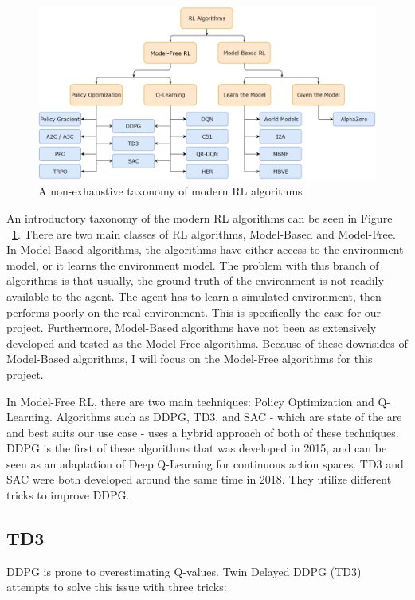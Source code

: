 \documentclass[12pt,twoside]{report}
\begin{document}
\begin{figure}[h]
\centering
\includegraphics[width = 0.9\hsize]{figures/RL algorithms.png}
\caption{A non-exhaustive taxonomy of modern RL algorithms \cite{openai:rl-algs}}
\label{fig:rl-algs}
\end{figure}

An introductory taxonomy of the modern RL algorithms can be seen in Figure ~\ref{fig:rl-algs}. There are two main classes of RL algorithms, Model-Based and Model-Free. In Model-Based algorithms, the algorithms have either access to the environment model, or it learns the environment model. The problem with this branch of algorithms is that usually, the ground truth of the environment is not readily available to the agent. The agent has to learn a simulated environment, then performs poorly on the real environment. This is specifically the case for our project. Furthermore, Model-Based algorithms have not been as extensively developed and tested as the Model-Free algorithms. \cite{openai:rl-algs} Because of these downsides of Model-Based algorithms, I will focus on the Model-Free algorithms for this project.

In Model-Free RL, there are two main techniques: Policy Optimization and Q-Learning. Algorithms such as DDPG, TD3, and SAC - which are state of the are and best suits our use case - uses a hybrid approach of both of these techniques.
DDPG is the first of these algorithms that was developed in 2015, and can be seen as an adaptation of Deep Q-Learning for continuous action spaces. \cite{ddpg} TD3 and SAC were both developed around the same time in 2018. They utilize different tricks to improve DDPG.

\subsection{TD3}
DDPG is prone to overestimating Q-values. Twin Delayed DDPG (TD3) attempts to solve this issue with three tricks: \cite{openai:td3}
\end{document}

